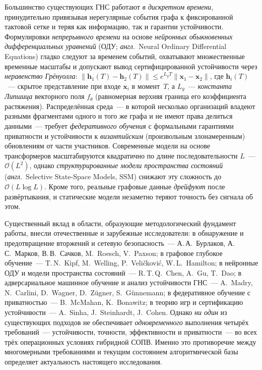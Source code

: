 \documentclass[12pt,a5paper]{article}
\begin{document}
Большинство существующих ГНС работают \emph{в дискретном
времени}, принудительно привязывая нерегулярные события
графа к фиксированной тактовой сетке и теряя как информацию,
так и гарантии устойчивости. Формулировки \emph{непрерывного
времени} на основе \emph{нейронных обыкновенных
дифференциальных уравнений}
(ОДУ; \emph{англ.}~Neural Ordinary Differential Equations)
гладко следуют за временем событий, охватывают множественные
временные масштабы и допускают вывод сертифицированной
устойчивости через \emph{неравенство Грёнуолла}:
$\|\mathbf{h}_1(T)-\mathbf{h}_2(T)\|\le e^{L_g T}
\|\mathbf{x}_1-\mathbf{x}_2\|$,
где $\mathbf{h}_i(T)$~--- скрытое представление при входе
$\mathbf{x}_i$ в момент~$T$, а $L_g$~--- \emph{константа
Липшица} векторного поля $f_\theta$ (равномерная верхняя
граница его коэффициента растяжения). Распределённая
среда~--- в которой несколько организаций владеют разными
фрагментами одного и того же графа и не имеют права делиться
данными~--- требует \emph{федеративного обучения} с
формальными гарантиями приватности и устойчивости к
\emph{византийским} (произвольным злонамеренным) обновлениям
от части участников. Современные модели на основе
трансформеров масштабируются квадратично по длине
последовательности $L$~--- $\mathcal{O}(L^2)$, однако
\emph{структурированные модели пространства состояний}
(\emph{англ.}~Selective State-Space Models, SSM) снижают
эту сложность до $\mathcal{O}(L\log L)$. Кроме того,
реальные графовые данные \emph{дрейфуют} после развёртывания,
и статические модели незаметно теряют точность без
сигнала об этом.

Существенный вклад в области, образующие методологический
фундамент работы, внесли отечественные и зарубежные
исследователи: в обнаружение и предотвращение вторжений и
сетевую безопасность~--- А.\,А.~Бурлаков, А.\,С.~Марков,
В.\,В.~Сачков, M.~Roesch, V.~Paxson; в графовое глубокое
обучение~--- T.\,N.~Kipf, M.~Welling, P.~Veli\v{c}kovi\'{c},
W.\,L.~Hamilton; в нейронные ОДУ и модели пространства
состояний~--- R.\,T.\,Q.~Chen, A.~Gu, T.~Dao; в адверсариальное
машинное обучение и анализ устойчивости ГНС~--- A.~Madry,
N.~Carlini, D.~Wagner, D.~Z\"ugner, S.~G\"unnemann; в
федеративное обучение с приватностью~--- B.~McMahan,
K.~Bonawitz; в теорию игр и сертификацию устойчивости~---
A.~Sinha, J.~Steinhardt, J.~Cohen. Однако \emph{ни один} из
существующих подходов не обеспечивает \emph{одновременного}
выполнения четырёх требований~--- устойчивости, точности,
эффективности и приватности~--- во всех трёх операционных
условиях гибридной СОПВ. Именно это противоречие между
многомерными требованиями и текущим состоянием алгоритмической
базы определяет актуальность настоящего исследования.
\end{document}
